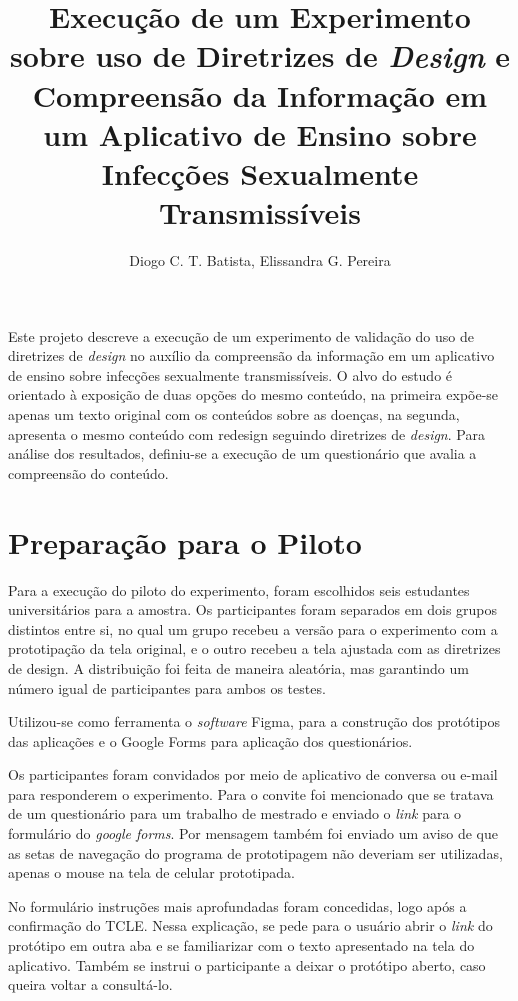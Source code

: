 \documentclass[12pt]{article}
\title{Execução de um Experimento sobre uso de Diretrizes de \textit{Design} e Compreensão da Informação em um Aplicativo de Ensino sobre Infecções Sexualmente Transmissíveis}
\author{Diogo C. T. Batista\inst{1}, Elissandra G. Pereira\inst{1}}
\begin{document}
\maketitle

\begin{resumo}
	Este projeto descreve a execução de um experimento de validação do uso de diretrizes de \textit{design} no auxílio da compreensão da informação em um aplicativo de ensino sobre infecções sexualmente transmissíveis. O alvo do estudo é orientado à exposição de duas opções do mesmo conteúdo, na primeira expõe-se apenas um texto original com os conteúdos sobre as doenças, na segunda, apresenta o mesmo conteúdo com redesign seguindo diretrizes de \textit{design}. Para análise dos resultados, definiu-se a execução de um questionário que avalia a compreensão do conteúdo.
\end{resumo}

\section{Preparação para o Piloto}

Para a execução do piloto do experimento, foram escolhidos seis estudantes universitários para a amostra. Os participantes foram separados em dois grupos distintos entre si, no qual um grupo recebeu a versão para o experimento com a prototipação da tela original, e o outro recebeu a tela ajustada com as diretrizes de design. A distribuição foi feita de maneira aleatória, mas garantindo um número igual de participantes para ambos os testes.

Utilizou-se como ferramenta o \textit{software} Figma, para a construção dos protótipos das aplicações e o Google Forms para aplicação dos questionários.

Os participantes foram convidados por meio de aplicativo de conversa ou e-mail para responderem o experimento. Para o convite foi mencionado que se tratava de um questionário para um trabalho de mestrado e enviado o \textit{link} para o formulário do \textit{google forms}. Por mensagem também foi enviado um aviso de que as setas de navegação do programa de prototipagem não deveriam ser utilizadas, apenas o mouse na tela de celular prototipada. 

No formulário instruções mais aprofundadas foram concedidas, logo após a confirmação do TCLE. Nessa explicação, se pede para o usuário abrir o  \textit{link} do protótipo em outra aba e se familiarizar com o texto apresentado na tela do aplicativo. Também se instrui o participante a deixar o protótipo aberto, caso queira voltar a consultá-lo.
\end{document}
